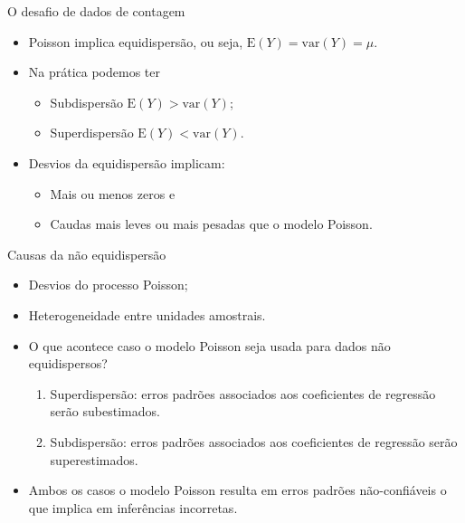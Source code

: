 \documentclass[10pt, aspectratio=169]{beamer}\usepackage[]{graphicx}\usepackage[]{color}
\begin{document}
\begin{frame}{O desafio de dados de contagem}
\begin{itemize}
\item Poisson implica equidispersão, ou seja, $\mathrm{E}(Y) = \mathrm{var}(Y) = \mu. $
\vspace{0,5cm}
\item Na prática podemos ter
\begin{itemize}
  \item Subdispersão $\mathrm{E}(Y) > \mathrm{var}(Y)$;
  \item Superdispersão $\mathrm{E}(Y) < \mathrm{var}(Y)$.
\end{itemize}
\vspace{0,5cm}
  \item Desvios da equidispersão implicam: 
  \begin{itemize}
    \item Mais ou menos zeros e
    \item Caudas mais leves ou mais pesadas que o modelo Poisson.
  \end{itemize}
\end{itemize}
\end{frame}

\begin{frame}{Causas da não equidispersão}
\begin{itemize}
\item Desvios do processo Poisson;
\item Heterogeneidade entre unidades amostrais.
\vspace{0,5cm}
\item O que acontece caso o modelo Poisson seja usada para dados não equidispersos?
\begin{enumerate}
  \item Superdispersão: erros padrões associados aos coeficientes de 
  regressão serão subestimados.
  \item Subdispersão: erros padrões associados aos coeficientes de 
  regressão serão superestimados.
\end{enumerate}
\vspace{0,5cm}
  \item Ambos os casos o modelo Poisson resulta em erros padrões 
  não-confiáveis o que implica em inferências incorretas.
\end{itemize}
\end{frame}
\end{document}
